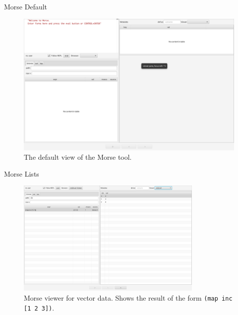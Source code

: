 \documentclass{beamer}
\begin{document}
\begin{frame}{Morse Default}
  \begin{figure}
    \centering
    \includegraphics[height=0.7\textheight]{../resources/MorseDefault.jpg}
    \caption{The default view of the Morse tool.}
    \label{fig:defaultMorse}
  \end{figure}
\end{frame}

\begin{frame}{Morse Lists}
  \begin{figure}
    \centering
    \includegraphics[width=0.8\textwidth]{../resources/MorseSuccessfulForm.png}
    \caption{Morse viewer for vector data. Shows the result of the form \texttt{(map inc [1 2 3])}.}
    \label{fig:MorseVec}
  \end{figure}
\end{frame}
\end{document}

